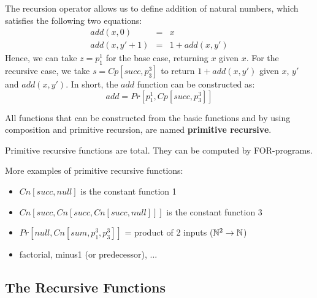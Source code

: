 \begin{itemize}
The recursion operator allows us to define addition of natural numbers, which satisfies
the following two equations:
\begin{eqnarray*}
\mathit{add}(x,0) & = & x \\
\mathit{add}(x,y'+1) & = & 1 + \mathit{add}(x,y') 
\end{eqnarray*}
Hence, we can take $z = p_1^1$ for the base case, returning $x$ given $x$.
For the recursive case, we take $s = \mathit{Cp}[\mathit{succ},p_3^3]$ 
to return $1 + \mathit{add}(x,y')$ given $x$, $y'$ and $\mathit{add}(x,y')$. In short,
the $\mathit{add}$ function can be constructed as:
\begin{equation*}
\mathit{add} = \mathit{Pr}[p_1^1,\mathit{Cp}[\mathit{succ},p_3^3]]
\end{equation*}
\end{itemize}


\begin{definition}
All functions that can be constructed from the basic functions and by using composition and primitive recursion, are named
{\bf primitive recursive}.
\end{definition}


Primitive recursive functions are total. They can be
computed by FOR-programs.

\begin{example}
More examples of primitive recursive functions:
\begin{itemize}
\item
$Cn[succ,null]$ is the constant function 1

\item
$Cn[succ,Cn[succ,Cn[succ,null]]]$ is the constant function 3

\item

$Pr[null,Cn[sum,p_1^3, p_3^3]]$ = product of 2 inputs ($\mathbb{N}^2 \rightarrow \mathbb{N}$)

\item
factorial, minus1 (or predecessor), ...

\end{itemize}
\end{example}

\subsection{The Recursive Functions}

